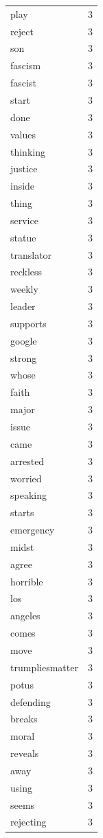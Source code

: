 \begin{tabular}{lr}
play & 3 \\
reject & 3 \\
son & 3 \\
fascism & 3 \\
fascist & 3 \\
start & 3 \\
done & 3 \\
values & 3 \\
thinking & 3 \\
justice & 3 \\
inside & 3 \\
thing & 3 \\
service & 3 \\
statue & 3 \\
translator & 3 \\
reckless & 3 \\
weekly & 3 \\
leader & 3 \\
supports & 3 \\
google & 3 \\
strong & 3 \\
whose & 3 \\
faith & 3 \\
major & 3 \\
issue & 3 \\
came & 3 \\
arrested & 3 \\
worried & 3 \\
speaking & 3 \\
starts & 3 \\
emergency & 3 \\
midst & 3 \\
agree & 3 \\
horrible & 3 \\
los & 3 \\
angeles & 3 \\
comes & 3 \\
move & 3 \\
trumpliesmatter & 3 \\
potus & 3 \\
defending & 3 \\
breaks & 3 \\
moral & 3 \\
reveals & 3 \\
away & 3 \\
using & 3 \\
seems & 3 \\
rejecting & 3 \\

\end{tabular}
